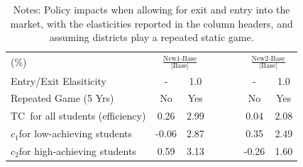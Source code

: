 \documentclass[notitlepage,12pt]{article}%
\begin{document}
\begin{table}[ptb]
\caption{State-Funded Teacher Bonuses: Extensive Margin and Repeated Game}%
\label{tab:ext_marg2}
\begin{center}%
\begin{tabular}
[c]{lccccccc}\hline\hline
{\small (\%)} & \multicolumn{2}{c}{$\frac{\text{New1-Base}}{\left\vert
\text{Base}\right\vert }$} &  &  &  & \multicolumn{2}{c}{$\frac
{\text{New2-Base}}{\left\vert \text{Base}\right\vert }$}\\
{\small Entry/Exit Elasiticity} & {\small -} & {\small 1.0} &  &  &  &
{\small -} & {\small 1.0}\\
{\small Repeated Game (5 Yrs)} & {\small No} & {\small Yes} &  &  &  &
{\small No} & {\small Yes}\\\hline
{\small TC\ for all students (efficiency)} & {\small 0.26} & {\small 2.99} &
&  &  & {\small 0.04} & {\small 2.08}\\
$c_{1}${\small for low-achieving students} & {\small -0.06} & {\small 2.87} &
&  &  & {\small 0.35} & {\small 2.49}\\
$c_{2}${\small for high-achieving students} & {\small 0.59} & {\small 3.13} &
&  &  & {\small -0.26} & {\small 1.60}\\\hline\hline
\end{tabular}
\end{center}
\par
\caption*{{\footnotesize Notes: Policy impacts when allowing for exit and
entry into the market, with the elasticities reported in the column headers,
and assuming districts play a repeated static game.}}\end{table}
\end{document}
